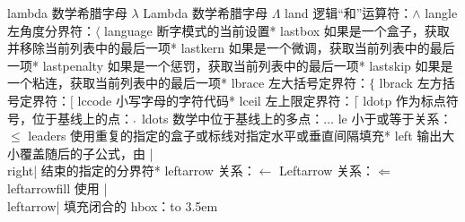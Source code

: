 \capcs lambda {数学希腊字母 $\lambda$}{}{}
\capcs Lambda {数学希腊字母 $\Lambda$}{}{}
\capcs land {逻辑“和”运算符：$\land$}{}{}
\capcs langle {左角度分界符：$\langle$}{}{}
\capcs language {断字模式的当前设置}*{}
\capcs lastbox {如果是一个盒子，获取并移除当前列表中的最后一项}*{}
\capcs lastkern {如果是一个微调，获取当前列表中的最后一项}*{}
\capcs lastpenalty {如果是一个惩罚，获取当前列表中的最后一项}*{}
\capcs lastskip {如果是一个粘连，获取当前列表中的最后一项}*{}
\capcs lbrace {左大括号定界符：$\lbrace$}{}{}
\capcs lbrack {左方括号定界符：$\lbrack$}{}{}
\capcs lccode {小写字母的字符代码}*{}
\capcs lceil {左上限定界符：$\lceil$}{}{}
\capcs ldotp {作为标点符号，位于基线上的点：$\ldotp$}{}{}
\capcs ldots {数学中位于基线上的多点：$\ldots$}{}{}
\capcs le {小于或等于关系：$\le$}{}{}
\capcs leaders {使用重复的指定的盒子或标线对指定水平或垂直间隔填充}*{}
\capcs left {输出大小覆盖随后的子公式，由 |\\right| 结束的指定的分界符}*{}
\capcs leftarrow {关系：$\leftarrow$}{}{}
\capcs Leftarrow {关系：$\Leftarrow$}{}{}
\capcs leftarrowfill {使用 |\\leftarrow| 填充闭合的 hbox：\hbox to 3.5em{\leftarrowfill}}{}{}
